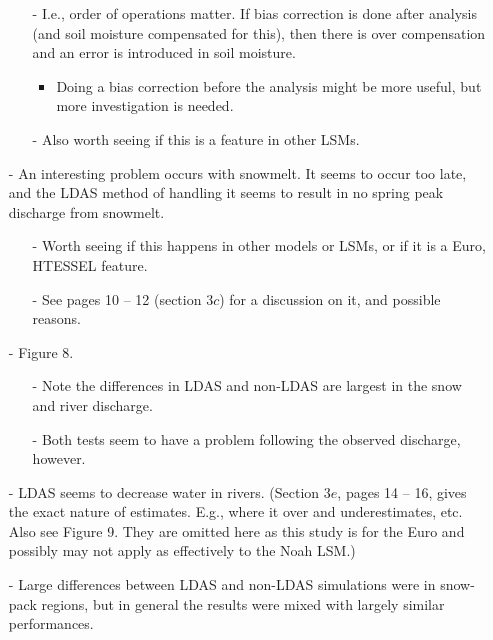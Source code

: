 \documentclass[12pt, letterpaper]{article}
\begin{document}
\begin{itemize}
\begin{itemize}
            \item[-] I.e., order of operations matter. If bias correction is done after analysis (and
                     soil moisture compensated for this), then there is over compensation and an error
                     is introduced in soil moisture.
            \begin{itemize}
            	\item Doing a bias correction before the analysis might be more useful, but more 
            	      investigation is needed.
            \end{itemize}
            \item[-] Also worth seeing if this is a feature in other LSMs.
        \end{itemize}
        \item[-] An interesting problem occurs with snowmelt. It seems to occur too late, and the LDAS
                 method of handling it seems to result in no spring peak discharge from snowmelt.
        \begin{itemize}
        	\item[-] Worth seeing if this happens in other models or LSMs, or if it is a Euro, HTESSEL
        	         feature.
        	\item[-] See pages 10 -- 12 (section $3c$) for a discussion on it, and possible reasons.
        \end{itemize}
        \item[-] Figure 8.
        \begin{itemize}
        	\item[-] Note the differences in LDAS and non-LDAS are largest in the snow and river 
        	         discharge.
        	\item[-] Both tests seem to have a problem following the observed discharge, however.
        \end{itemize}
        \item[-] LDAS seems to decrease water in rivers. (Section $3e$, pages 14 -- 16, gives the
                 exact nature of estimates. E.g., where it over and underestimates, etc. Also see
                 Figure 9. They are omitted here as this study is for the Euro and possibly may not
                 apply as effectively to the Noah LSM.)
        \item[-] Large differences between LDAS and non-LDAS simulations were in snow-pack regions,
                 but in general the results were mixed with largely similar performances.
        \begin{itemize}

\end{itemize}
\end{itemize}
\end{document}
